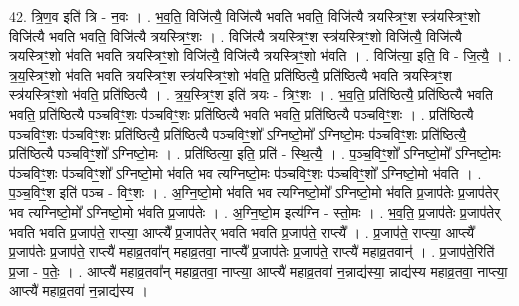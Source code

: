 \documentclass[17pt]{extarticle}
\begin{document}
42. त्रि॒ण॒व इति॑ त्रि - न॒वः । . भ॒व॒ति॒ विजि॑त्यै॒ विजि॑त्यै भवति भवति॒ विजि॑त्यै त्रयस्त्रिꣳ॒॒श स्त्र॑यस्त्रिꣳ॒॒शो विजि॑त्यै भवति भवति॒ विजि॑त्यै त्रयस्त्रिꣳ॒॒शः । . विजि॑त्यै त्रयस्त्रिꣳ॒॒श स्त्र॑यस्त्रिꣳ॒॒शो विजि॑त्यै॒ विजि॑त्यै त्रयस्त्रिꣳ॒॒शो भ॑वति भवति त्रयस्त्रिꣳ॒॒शो विजि॑त्यै॒ विजि॑त्यै त्रयस्त्रिꣳ॒॒शो भ॑वति । . विजि॑त्या॒ इति॒ वि - जि॒त्यै॒ । . त्र॒य॒स्त्रिꣳ॒॒शो भ॑वति भवति त्रयस्त्रिꣳ॒॒श स्त्र॑यस्त्रिꣳ॒॒शो भ॑वति॒ प्रति॑ष्ठित्यै॒ प्रति॑ष्ठित्यै भवति त्रयस्त्रिꣳ॒॒श स्त्र॑यस्त्रिꣳ॒॒शो भ॑वति॒ प्रति॑ष्ठित्यै । . त्र॒य॒स्त्रिꣳ॒॒श इति॑ त्रयः - त्रिꣳ॒॒शः । . भ॒व॒ति॒ प्रति॑ष्ठित्यै॒ प्रति॑ष्ठित्यै भवति भवति॒ प्रति॑ष्ठित्यै पञ्चविꣳ॒॒शः प॑ञ्चविꣳ॒॒शः प्रति॑ष्ठित्यै भवति भवति॒ प्रति॑ष्ठित्यै पञ्चविꣳ॒॒शः । . प्रति॑ष्ठित्यै पञ्चविꣳ॒॒शः प॑ञ्चविꣳ॒॒शः प्रति॑ष्ठित्यै॒ प्रति॑ष्ठित्यै पञ्चविꣳ॒॒शो᳚ ऽग्निष्टो॒मो᳚ ऽग्निष्टो॒मः प॑ञ्चविꣳ॒॒शः प्रति॑ष्ठित्यै॒ प्रति॑ष्ठित्यै पञ्चविꣳ॒॒शो᳚ ऽग्निष्टो॒मः । . प्रति॑ष्ठित्या॒ इति॒ प्रति॑ - स्थि॒त्यै॒ । . प॒ञ्च॒विꣳ॒॒शो᳚ ऽग्निष्टो॒मो᳚ ऽग्निष्टो॒मः प॑ञ्चविꣳ॒॒शः प॑ञ्चविꣳ॒॒शो᳚ ऽग्निष्टो॒मो भ॑वति भव त्यग्निष्टो॒मः प॑ञ्चविꣳ॒॒शः प॑ञ्चविꣳ॒॒शो᳚ ऽग्निष्टो॒मो भ॑वति । . प॒ञ्च॒विꣳ॒॒श इति॑ पञ्च - विꣳ॒॒शः । . अ॒ग्नि॒ष्टो॒मो भ॑वति भव त्यग्निष्टो॒मो᳚ ऽग्निष्टो॒मो भ॑वति प्र॒जाप॑तेः प्र॒जाप॑तेर् भव त्यग्निष्टो॒मो᳚ ऽग्निष्टो॒मो भ॑वति प्र॒जाप॑तेः । . अ॒ग्नि॒ष्टो॒म इत्य॑ग्नि - स्तो॒मः । . भ॒व॒ति॒ प्र॒जाप॑तेः प्र॒जाप॑तेर् भवति भवति प्र॒जाप॑ते॒ राप्त्या॒ आप्त्यै᳚ प्र॒जाप॑तेर् भवति भवति प्र॒जाप॑ते॒ राप्त्यै᳚ । . प्र॒जाप॑ते॒ राप्त्या॒ आप्त्यै᳚ प्र॒जाप॑तेः प्र॒जाप॑ते॒ राप्त्यै॑ महाव्र॒तवा᳚न् महाव्र॒तवा॒ नाप्त्यै᳚ प्र॒जाप॑तेः प्र॒जाप॑ते॒ राप्त्यै॑ महाव्र॒तवान्॑ । . प्र॒जाप॑ते॒रिति॑ प्र॒जा - प॒तेः॒ । . आप्त्यै॑ महाव्र॒तवा᳚न् महाव्र॒तवा॒ नाप्त्या॒ आप्त्यै॑ महाव्र॒तवा॑ न॒न्नाद्य॑स्या॒ न्नाद्य॑स्य महाव्र॒तवा॒ नाप्त्या॒ आप्त्यै॑ महाव्र॒तवा॑ न॒न्नाद्य॑स्य । \newline
\end{document}

